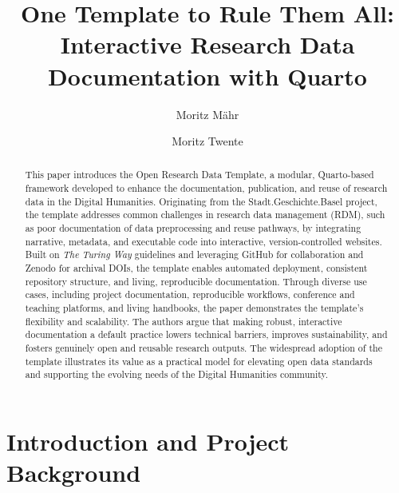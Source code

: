 \documentclass[final]{anthology-ch} %
\title{One Template to Rule Them All: Interactive Research Data Documentation with Quarto}
\author[1,2]{Moritz Mähr}[
  orcid=0000-0002-1367-1618
]
\author[1]{Moritz Twente}[
  orcid=0009-0005-7187-9774
]
\affiliation{1}{University of Basel, Switzerland}
\affiliation{2}{University of Bern, Switzerland}
\begin{document}
\maketitle

\begin{abstract}
This paper introduces the Open Research Data Template, a modular, Quarto-based framework developed to enhance the documentation, publication, and reuse of research data in the Digital Humanities. Originating from the Stadt.Geschichte.Basel project, the template addresses common challenges in research data management (RDM), such as poor documentation of data preprocessing and reuse pathways, by integrating narrative, metadata, and executable code into interactive, version-controlled websites. Built on \emph{The Turing Way} guidelines and leveraging GitHub for collaboration and Zenodo for archival DOIs, the template enables automated deployment, consistent repository structure, and living, reproducible documentation. Through diverse use cases, including project documentation, reproducible workflows, conference and teaching platforms, and living handbooks, the paper demonstrates the template’s flexibility and scalability. The authors argue that making robust, interactive documentation a default practice lowers technical barriers, improves sustainability, and fosters genuinely open and reusable research outputs. The widespread adoption of the template illustrates its value as a practical model for elevating open data standards and supporting the evolving needs of the Digital Humanities community.
\end{abstract}

\section{Introduction and Project Background}\label{introduction-and-project-background}
\end{document}
